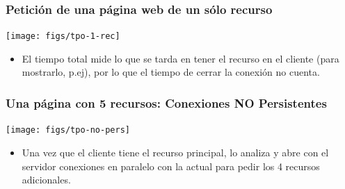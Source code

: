 \documentclass[hyperref={pdfpagelabels=true},ucs]{beamer}
\newcommand{\res}[1]{\textcolor{darkred}{#1}}
\begin{document}

\begin{frame}[shrink=10]
\frametitle{Petición de una página web de un sólo recurso}

\begin{center}
\texttt{[image: figs/tpo-1-rec]}
\end{center}

\begin{itemize}
\item El tiempo total mide lo que se tarda en tener el recurso en el
  cliente (para mostrarlo, p.ej), por lo que el tiempo de cerrar la
  conexión no cuenta.
\end{itemize}




\end{frame}




\begin{frame}[shrink=10]
\frametitle{Una página con 5 recursos: Conexiones NO Persistentes}

\begin{center}
\texttt{[image: figs/tpo-no-pers]}
\end{center}

\begin{itemize}
\item Una vez que el cliente tiene el recurso principal, lo analiza y
  abre con el servidor conexiones en paralelo con la actual para pedir
  los 4 recursos adicionales.
\end{itemize}


\end{frame}
\end{document}
